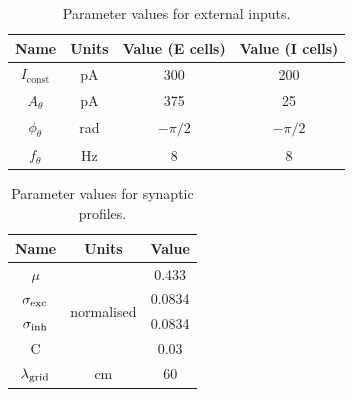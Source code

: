 \documentclass[a4paper,12pt]{article}
\newcommand{\ssc}[3]{\ensuremath{#1_{\text{#2}_{\text{#3}}}}}
\newcommand{\Iconst}   {\ssc{I}      {const} {}}
\newcommand{\Atheta}   {\ssc{A}      {$\theta$}{}}
\newcommand{\ftheta}   {\ssc{f}      {$\theta$}{}}
\newcommand{\phitheta} {\ssc{\phi}   {$\theta$}{}}
\newcommand{\sigmasub}[1]{\ssc{\sigma}{\scriptsize{#1}}{}}
\newcommand{\lamgrid}{\ssc{\lambda}{\scriptsize{grid}}{}}
\begin{document}
\begin{table}
    \internallinenumbers
    \centering
    \begin{tabular}{| c | c | c | c |}
        \hline
        Name       & Units & Value (E cells) & Value (I cells) \\
        \hline\hline
        $\Iconst$  & pA    & 300             & 200             \\
        $\Atheta$  & pA    & 375             & 25              \\
        $\phitheta$& rad   & $-\pi/2$        & $-\pi/2$        \\
        $\ftheta$  & Hz    & 8               & 8               \\
        \hline
    \end{tabular}
    \caption{Parameter values for external inputs.}
\end{table}

\begin{table}
    \internallinenumbers
    \centering
    \begin{tabular}{| c | c | c |}
        \hline
        Name              & Units                        & Value   \\
        \hline\hline
        $\mu$             & \multirow{4}{*}{normalised}  & 0.433   \\
        $\sigmasub{exc}$  &                              & 0.0834  \\
        $\sigmasub{inh}$  &                              & 0.0834  \\
        C                 &                              & 0.03    \\
        \lamgrid          & cm                           & 60      \\
        \hline
    \end{tabular}
    \caption{Parameter values for synaptic profiles.}
    \label{tab:params_syn}
\end{table}

\clearpage





\clearpage
\end{document}
